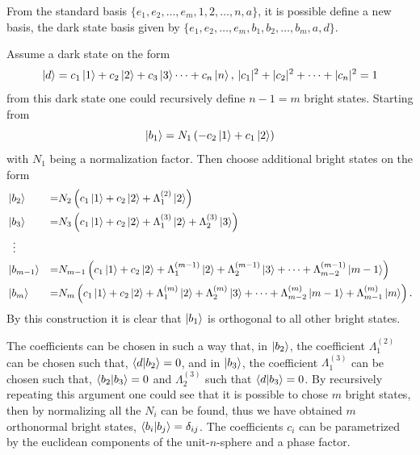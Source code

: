 From the standard basis $\{e_1,e_2,\dots,e_m,1,2,\dots,n,a\}$, it is possible define a new basis, the dark state basis given by $\{e_1,e_2,\dots,e_m,b_1,b_2,\dots,b_{m},a,d\}$.

Assume a dark state on the form 
\begin{equation}
\ket{d} = c_1\ket{1} + c_2\ket{2} + c_3\ket{3} \dots + c_{n}\ket{n},\, |c_1|^2 + |c_2|^2 + \dots + |c_{n}|^2 = 1
\end{equation}
from this dark state one could recursively define $n-1 = m$ bright states.
Starting from
\begin{equation}
\ket{b_1} = N_1\left(-c_2\ket{1} + c_1\ket{2}\right)
\end{equation}
with $N_1$ being a normalization factor. Then choose additional bright states on the form
\begin{equation}
\begin{aligned}
&\ket{b_2} &=& N_2 \left(c_1\ket{1} + c_2\ket{2} + \Lambda_{1}^{(2)}\ket{2}  \right)
\\
&\ket{b_3} &=&  N_3 \left(c_1\ket{1} + c_2\ket{2} + \Lambda_{1}^{(3)}\ket{2} + \Lambda_{2}^{(3)}\ket{3} \right)
\\
&\;\;\vdots
\\
&\ket{b_{m-1}} &=& N_{m-1} \left( c_1\ket{1} + c_2\ket{2} + \Lambda_{1}^{(m-1)}\ket{2} + \Lambda_{2}^{(m-1)}\ket{3} + \dots + \Lambda_{m-2}^{(m-1)}\ket{m-1} \right)
\\
&\ket{b_{m}} &=& N_m \left( c_1\ket{1} + c_2\ket{2} + \Lambda_{1}^{(m)}\ket{2} + \Lambda_{2}^{(m)}\ket{3} + \dots + \Lambda_{m-2}^{(m)}\ket{m-1} + \Lambda_{m-1}^{(m)}\ket{m} \right).
\end{aligned}
\end{equation}
By this construction it is clear that $\ket{b_1}$ is orthogonal to all other bright states.

The coefficients can be chosen in such a way that, in $\ket{b_2}$, the coefficient $\Lambda_1^{(2)}$ can be chosen such that, $\bra{d}\ket{b_2} = 0$, and in $\ket{b_3}$, the coefficient $\Lambda_1^{(3)}$ can be chosen such that, $\bra{b_2}\ket{b_3} = 0$ and $\Lambda_2^{(3)}$ such that $\bra{d}\ket{b_3} = 0$. By recursively repeating this argument one could see that it is possible to chose $m$ bright states, then by normalizing all the $N_i$ can be found, thus we have obtained $m$ orthonormal bright states, $\bra{b_i}\ket{b_j} = \delta_{ij}$.
The coefficients $c_i$ can be parametrized by the euclidean components of the unit-$n$-sphere and a phase factor.


